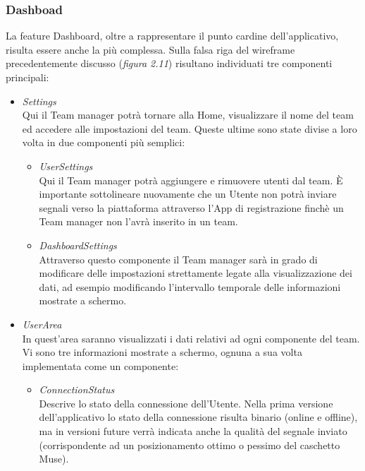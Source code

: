 \subsubsection{Dashboad}
La feature Dashboard, oltre a rappresentare il punto cardine dell'applicativo, risulta essere anche la più complessa.\newline
Sulla falsa riga del wireframe precedentemente discusso (\emph{figura 2.11}) risultano individuati tre componenti principali:
\begin{itemize}
  \item \emph{Settings}\\
  Qui il Team manager potrà tornare alla Home, visualizzare il nome del team ed accedere alle impostazioni del team.\newline
  Queste ultime sono state divise a loro volta in due componenti più semplici:
  \begin{itemize}
    \item \emph{UserSettings}\\
    Qui il Team manager potrà aggiungere e rimuovere utenti dal team.\newline
    È importante sottolineare nuovamente che un Utente non potrà inviare segnali verso la piattaforma attraverso l'App di registrazione finchè un Team manager non l'avrà inserito in un team.
    \item \emph{DashboardSettings}\\
    Attraverso questo componente il Team manager sarà in grado di modificare delle impostazioni strettamente legate alla visualizzazione dei dati, ad esempio modificando l'intervallo temporale delle informazioni mostrate a schermo.
  \end{itemize}
  \item \emph{UserArea}\\
  In quest'area saranno visualizzati i dati relativi ad ogni componente del team.\newline
  Vi sono tre informazioni mostrate a schermo, ognuna a sua volta implementata come un componente:
  \begin{itemize}
    \item \emph{ConnectionStatus}\\
    Descrive lo stato della connessione dell'Utente.\newline
    Nella prima versione dell'applicativo lo stato della connessione risulta binario (online e offline), ma in versioni future verrà indicata anche la qualità del segnale inviato (corrispondente ad un posizionamento ottimo o pessimo del caschetto Muse).

\end{itemize}
\end{itemize}
